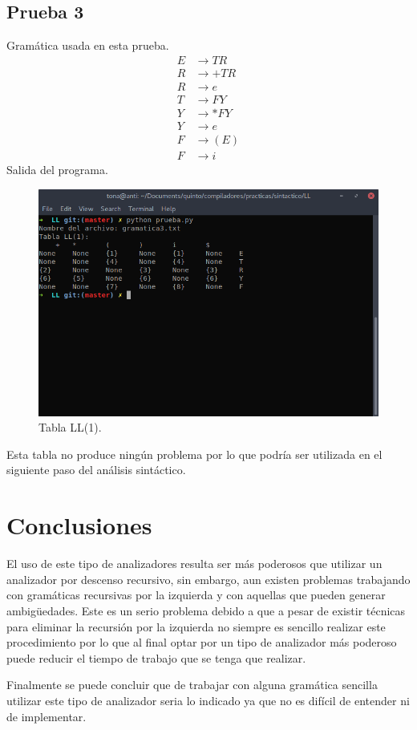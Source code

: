 \documentclass[12pt, titlepage]{article}
\begin{document}
    \subsection{Prueba 3}
    Gramática usada en esta prueba.
    \setcounter{equation}{0}
    \begin{align}
        E &\rightarrow TR \\
        R &\rightarrow +TR \\
        R &\rightarrow e \\
        T &\rightarrow FY \\
        Y &\rightarrow *FY \\
        Y &\rightarrow e \\
        F &\rightarrow (E) \\
        F &\rightarrow i
    \end{align}
    Salida del programa.
    \begin{figure}[H]
        \begin{center}
            \includegraphics[width=15cm]{gramatica3.png}
            \caption{Tabla LL(1).}
            \label{fig:prueba3}
        \end{center}
    \end{figure}
    Esta tabla no produce ningún problema por lo que podría ser utilizada en el 
siguiente paso del análisis sintáctico.
    \newpage
    \section{Conclusiones}
    El uso de este tipo de analizadores resulta ser más poderosos que utilizar 
un analizador por descenso recursivo, sin embargo, aun existen problemas 
trabajando con gramáticas recursivas por la izquierda y con aquellas que pueden 
generar ambigüedades. Este es un serio problema debido a que a pesar de existir 
técnicas para eliminar la recursión por la izquierda no siempre es sencillo 
realizar este procedimiento por lo que al final optar por un tipo de analizador 
más poderoso puede reducir el tiempo de trabajo que se tenga que realizar.

Finalmente se puede concluir que de trabajar con alguna gramática sencilla 
utilizar este tipo de analizador seria lo indicado ya que no es difícil de 
entender ni de implementar.
     
    
\end{document}

